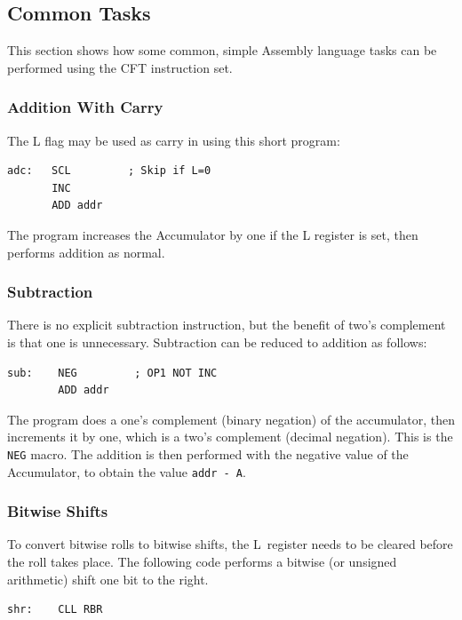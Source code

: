 \documentclass[11pt,a4paper,twocolumns]{article}
\newcommand\register[1]{\textsf{#1}}
\newcommand\Lreg{\register{L}}
\begin{document}
\subsection{Common Tasks}

This section shows how some common, simple Assembly language tasks can
be performed using the CFT instruction set.

\subsubsection{Addition With Carry}

The L flag may be used as carry in using this short program:
\begin{verbatim}
adc:   SCL         ; Skip if L=0
       INC
       ADD addr
\end{verbatim}

The program increases the Accumulator by one if the L register is set,
then performs addition as normal.

\subsubsection{Subtraction}

There is no explicit subtraction instruction, but the benefit of two's
complement is that one is unnecessary. Subtraction can be reduced to
addition as follows:

\begin{verbatim}
sub:    NEG         ; OP1 NOT INC
        ADD addr
\end{verbatim}

The program does a one's complement (binary negation) of the
accumulator, then increments it by one, which is a two's complement
(decimal negation). This is the {\tt NEG} macro. The addition is then
performed with the negative value of the Accumulator, to obtain the
value {\tt addr - A}.

\subsubsection{Bitwise Shifts}

To convert bitwise rolls to bitwise shifts, the \Lreg\ register needs
to be cleared before the roll takes place. The following code performs
a bitwise (or unsigned arithmetic) shift one bit to the right.

\begin{verbatim}
shr:    CLL RBR
\end{verbatim}
\end{document}

